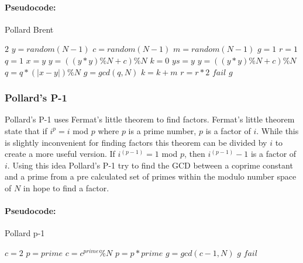 \paragraph{Pseudocode:}

\textcolor{white}{ }

\begin{algorithm}[H]
\caption{Pollard Brent}
\begin{algorithmic}
	 	\State \Return $2$
	\EndIf
	\State $y = random(N-1)$
	\State $c = random(N-1)$
	\State $m = random(N-1)$
	\State $g = 1$
	\State $r = 1$
	\State $q = 1$
		\State $x = y$
			\State $y = ((y*y)\%N+c)\%N$
		\EndFor
		\State $k = 0$
			\State $ys = y$
				\State $y = ((y*y)\%N+c)\%N$
				\State $q = q * (|x-y|)\%N$
			\EndFor
			\State $g = gcd(q,N)$
			\State $k = k + m$
		\EndWhile
		\State $r = r * 2$ 
	\EndWhile
		\State \Return $fail$
	\EndIf
	\State \Return $g$	
\EndFunction
\end{algorithmic}
\end{algorithm}

\subsubsection{Pollard’s P-1}

Pollard’s P-1 uses Fermat’s little theorem to find factors. Fermat’s little theorem state that if $i^p = i$ mod $p$ where $p$ is a prime number, $p$ is a factor of $i$. While this is slightly inconvenient for finding factors this theorem can be divided by $i$ to create a more useful version. If $i^{(p-1)} = 1$ mod $p$, then $i^{(p-1)} - 1$ is a factor of $i$.
Using this idea Pollard’s P-1 try to find the GCD between a coprime constant and a prime from a pre calculated set of primes within the modulo number space of $N$ in hope to find a factor.

\paragraph{Pseudocode:}

\textcolor{white}{ }

\begin{algorithm}[H]
\caption{Pollard p-1}
\begin{algorithmic}
	\State $c = 2$
		\State$p = prime$
			\State $c = c^{prime}\%N$
			\State $p = p * prime$
		\EndWhile
	\EndFor
	\State $g = gcd(c-1,N)$
		\State \Return $g$
	\Else
		\State \Return $fail$
	\EndIf
\EndFunction
\end{algorithmic}
\end{algorithm}

